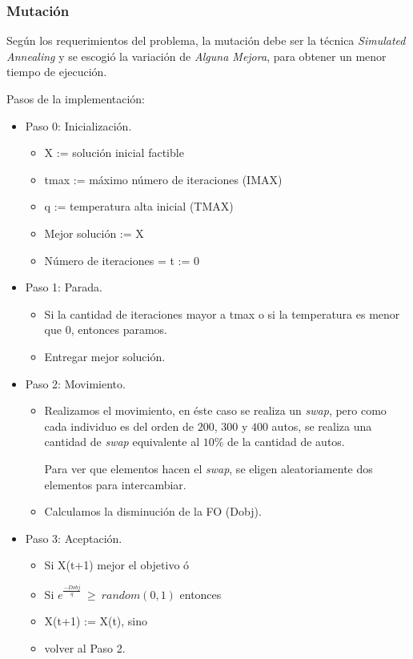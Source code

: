 \subsubsection{Mutación}
Según los requerimientos del problema, la mutación debe ser la técnica \emph{Simulated Annealing} y se escogió la variación
de \emph{Alguna Mejora}, para obtener un menor tiempo de ejecución.

Pasos de la implementación:

\begin{itemize}
	\item Paso 0: Inicialización.
	\begin{itemize}
		\item X := solución inicial factible
		\item tmax := máximo número de iteraciones (IMAX)
		\item q := temperatura alta inicial (TMAX)
		\item Mejor solución := X
		\item Número de iteraciones = t := 0
	\end{itemize}
	\item Paso 1: Parada.
	\begin{itemize}
		\item Si la cantidad de iteraciones mayor a tmax o si la temperatura es menor que $0$,
			entonces paramos.
		\item Entregar mejor solución.
	\end{itemize}
	\item Paso 2: Movimiento.
	\begin{itemize}
		\item Realizamos el movimiento, en éste caso se realiza un \emph{swap},
			pero como cada individuo es del orden de $200$, $300$ y $400$ autos,
			se realiza una cantidad de \emph{swap} equivalente al $10\%$ de la cantidad de autos.
			
			Para ver que elementos hacen el \emph{swap}, se eligen aleatoriamente dos elementos para intercambiar.
		\item Calculamos la disminución de la FO (Dobj).
	\end{itemize}
	\item Paso 3: Aceptación.
	\begin{itemize}
		\item Si X(t+1) mejor el objetivo ó
		\item Si $e^{\frac{-Dobj}{q}}\ \ge\ random(0,1)$ entonces
		\item X(t+1) := X(t), sino
		\item volver al Paso 2.
		

\end{itemize}
\end{itemize}
